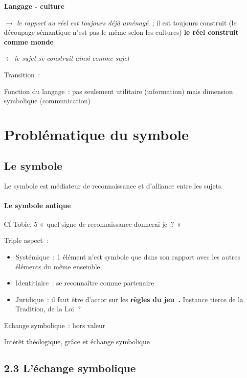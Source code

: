 \textbf{Langage - culture}

{$\rightarrow$ \textit{le rapport au réel est toujours déjà aménagé~;} il est toujours
construit (le découpage sémantique n'est pas le même selon les cultures)
\textbf{le réel construit comme monde}}

\emph{$\leftarrow$le sujet se construit ainsi comme sujet}

Transition~:

Fonction du langage~: pas seulement utilitaire (information) mais
dimension symbolique (communication)

\hypertarget{probluxe9matique-du-symbole}{%
\section{Problématique du symbole}\label{probluxe9matique-du-symbole}}

\hypertarget{le-symbole}{%
\subsection{Le symbole}\label{le-symbole}}

Le symbole est médiateur de reconnaissance et d'alliance entre les
sujets.

 
\paragraph{Le symbole antique}
 

Cf Tobie, 5 «~quel signe de reconnaissance donnerai-je~?~»

Triple aspect~:

\begin{itemize}
\item
  Systémique~: 1 élément n'est symbole que dans son rapport avec les
  autres éléments du même ensemble
\item
  Identitiaire~: se reconnaître comme partenaire
\item
  Juridique~: il faut être d'accor sur les \textbf{règles du jeu~.}
  Instance tierce de la Tradition, de la Loi~?
\end{itemize}


Echange symbolique~: hors valeur

Intérêt théologique, grâce et échange symbolique

\hypertarget{luxe9change-symbolique}{%
\subsection{2.3 L'échange symbolique}\label{luxe9change-symbolique}}

